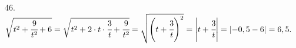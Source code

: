 46. $\sqrt{t^2+\cfrac{9}{t^2}+6}=\sqrt{t^2+2\cdot t\cdot\cfrac{3}{t}+\cfrac{9}{t^2}}=\sqrt{\left(t+\cfrac{3}{t}\right)^2}=\left|t+\cfrac{3}{t}\right|=\left|-0,5-6\right|=6,5.$\\
